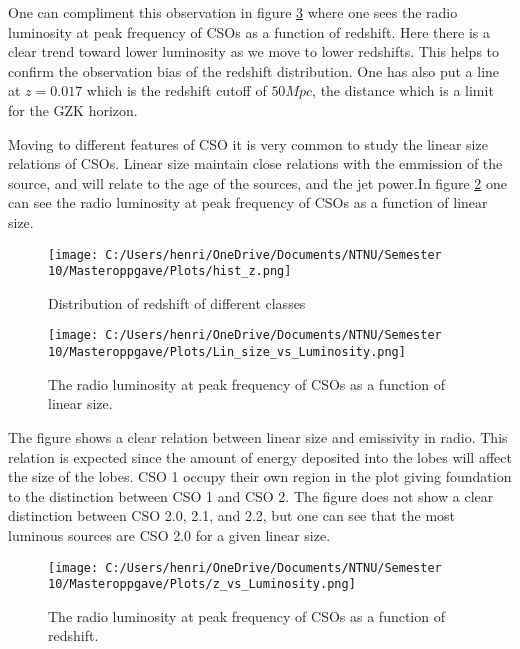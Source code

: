 One can compliment this observation in figure \ref{fig:Luminosity_redshift} where  one sees the radio luminosity at peak frequency of CSOs as a function of redshift. Here there is a clear trend toward lower luminosity as we move to lower redshifts. This helps to confirm the observation bias of the redshift distribution. One has also put a line at $z=0.017$ which is the redshift cutoff of $50 Mpc$, the distance which is a limit for the GZK horizon. 


Moving to different features of CSO it is very common to study the linear size relations of CSOs. Linear size maintain close relations with the emmission of the source, and will relate to the age of the sources, and the jet power.In figure \ref{fig:Luminosity_size} one can see the radio luminosity at peak frequency of CSOs as a function of linear size. 

\begin{figure}
    \centering
    \texttt{[image: C:/Users/henri/OneDrive/Documents/NTNU/Semester 10/Masteroppgave/Plots/hist\_z.png]}
    \caption{Distribution of redshift of different classes}
    \label{fig:redshift_hist}
\end{figure}

\begin{figure}
    \centering
    \texttt{[image: C:/Users/henri/OneDrive/Documents/NTNU/Semester 10/Masteroppgave/Plots/Lin\_size\_vs\_Luminosity.png]}
    \caption{The radio luminosity at peak frequency of CSOs as a function of linear size.}
    \label{fig:Luminosity_size}
\end{figure}

The figure shows a clear relation between linear size and emissivity in radio. This relation is expected since the amount of energy deposited into the lobes will affect the size of the lobes. CSO 1 occupy their own region in the plot giving foundation to the distinction between CSO 1 and CSO 2. The figure does not show a clear distinction between CSO 2.0, 2.1, and 2.2, but one can see that the most luminous sources are CSO 2.0 for a given linear size. 




\begin{figure}
    \centering
    \texttt{[image: C:/Users/henri/OneDrive/Documents/NTNU/Semester 10/Masteroppgave/Plots/z\_vs\_Luminosity.png]}
    \caption{The radio luminosity at peak frequency of CSOs as a function of redshift.}
    \label{fig:Luminosity_redshift}
\end{figure}


